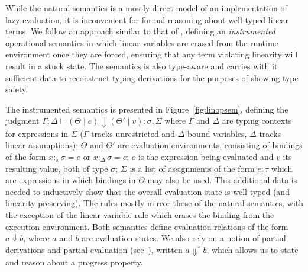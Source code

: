 \documentclass[acmsmall,review,screen]{acmart}
\begin{document}

While the natural semantics is a mostly direct model of an implementation
of lazy evaluation, it is inconvenient for formal reasoning about
well-typed linear terms.
%
We follow an approach
similar to that of \cite{cite:linearhaskell}, defining
an \emph{instrumented} operational semantics in which linear variables are
erased from 
the runtime environment once they are forced, ensuring that any term violating linearity
will result in a stuck state. The semantics is also type-aware and
carries with it sufficient data to reconstruct typing derivations for
the purposes of showing type safety.

The instrumented semantics is presented in
Figure~\ref{fig:linopsem}, defining the judgment $\Gamma ; \Delta \vdash (\Theta \mid e) \Downarrow (\Theta'
\mid v) : \sigma , \Sigma$ where $\Gamma$ and $\Delta$ are typing
contexts for expressions in $\Sigma$
($\Gamma$ tracks unrestricted and $\Delta$-bound variables, $\Delta$ tracks linear
assumptions);
$\Theta$ and $\Theta'$ are evaluation environments, consisting of bindings of the form
$x :_\pi \sigma = e$ or $x :_\Delta \sigma = e$; $e$ is the expression being evaluated and $v$
its resulting value, both of type $\sigma$; $\Sigma$ is a list of assignments of the form
$e : \tau$ which are expressions in which
bindings in $\Theta$ may also be used. This additional data is needed to
inductively show that the overall evaluation state is well-typed (and
linearity preserving). The rules mostly mirror those of the natural
semantics, with the exception of the linear variable rule which erases
the binding from the execution environment. Both semantics define
evaluation relations of the form $a \Downarrow b$, where $a$ and $b$
are evaluation states. We also rely on a notion
of partial derivations and partial evaluation (see~\cite{techreport}), written $a\Downarrow^* b$, which allows us
to state and reason about a progress property.
\end{document}
